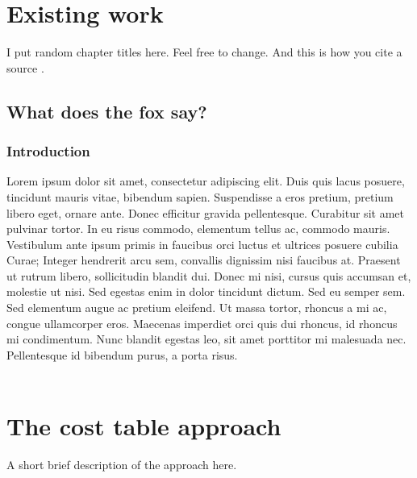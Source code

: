 \documentclass[12pt,a4paper,oneside]{report}
\begin{document}

\chapter{Existing work}
I put random chapter titles here. Feel free to change. And this is how you cite a source \cite{randomblogpost}.

\section{What does the fox say?}
\subsection{Introduction}
Lorem ipsum dolor sit amet, consectetur adipiscing elit. Duis quis lacus posuere, tincidunt mauris vitae, bibendum sapien. Suspendisse a eros pretium, pretium libero eget, ornare ante. Donec efficitur gravida pellentesque. Curabitur sit amet pulvinar tortor. In eu risus commodo, elementum tellus ac, commodo mauris. Vestibulum ante ipsum primis in faucibus orci luctus et ultrices posuere cubilia Curae; Integer hendrerit arcu sem, convallis dignissim nisi faucibus at. Praesent ut rutrum libero, sollicitudin blandit dui. Donec mi nisi, cursus quis accumsan et, molestie ut nisi. Sed egestas enim in dolor tincidunt dictum. Sed eu semper sem. Sed elementum augue ac pretium eleifend. Ut massa tortor, rhoncus a mi ac, congue ullamcorper eros. Maecenas imperdiet orci quis dui rhoncus, id rhoncus mi condimentum. Nunc blandit egestas leo, sit amet porttitor mi malesuada nec. Pellentesque id bibendum purus, a porta risus. \\\\


\chapter{The cost table approach}
A short brief description of the approach here.
\end{document}
